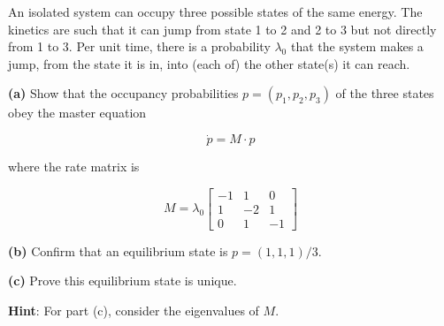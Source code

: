 \documentclass[
  letterpaper,
  DIV=11,
  numbers=noendperiod]{scrreprt}
\begin{document}
An isolated system can occupy three possible states of the same energy.
The kinetics are such that it can jump from state 1 to 2 and 2 to 3 but
not directly from 1 to 3. Per unit time, there is a probability
\(\lambda_0\) that the system makes a jump, from the state it is in,
into (each of) the other state(s) it can reach.

\textbf{(a)} Show that the occupancy probabilities
\(p = (p_1, p_2, p_3)\) of the three states obey the master equation

\[
\dot{p} = M \cdot p
\]

where the rate matrix is

\[
M = \lambda_0 \begin{bmatrix}
-1 & 1 & 0 \\
1 & -2 & 1 \\
0 & 1 & -1
\end{bmatrix}
\]

\textbf{(b)} Confirm that an equilibrium state is \(p = (1, 1, 1)/3\).

\textbf{(c)} Prove this equilibrium state is unique.

\textbf{Hint}: For part (c), consider the eigenvalues of \(M\).
\end{document}
